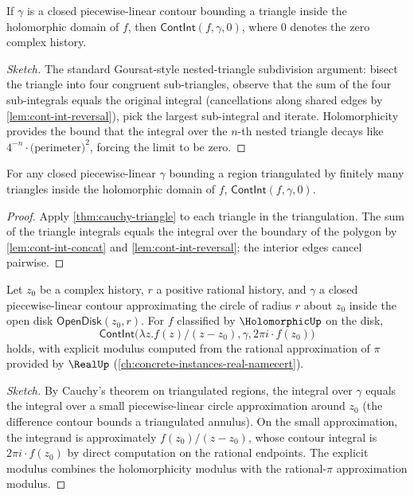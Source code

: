 \begin{theorem}
\label{thm:cauchy-triangle}
If \(\gamma\) is a closed piecewise-linear contour bounding a triangle inside the holomorphic domain of \(f\), then \(\mathsf{ContInt}(f, \gamma, 0)\), where \(0\) denotes the zero complex history.
\end{theorem}
\begin{proof}[Sketch]
The standard Goursat-style nested-triangle subdivision argument: bisect the triangle into four congruent sub-triangles, observe that the sum of the four sub-integrals equals the original integral (cancellations along shared edges by \autoref{lem:cont-int-reversal}), pick the largest sub-integral and iterate. Holomorphicity provides the bound that the integral over the \(n\)-th nested triangle decays like \(4^{-n} \cdot \text{(perimeter)}^2\), forcing the limit to be zero.
\end{proof}

\begin{lemma}
\label{lem:cauchy-polygon}
For any closed piecewise-linear \(\gamma\) bounding a region triangulated by finitely many triangles inside the holomorphic domain of \(f\), \(\mathsf{ContInt}(f, \gamma, 0)\).
\end{lemma}
\begin{proof}
Apply \autoref{thm:cauchy-triangle} to each triangle in the triangulation. The sum of the triangle integrals equals the integral over the boundary of the polygon by \autoref{lem:cont-int-concat} and \autoref{lem:cont-int-reversal}; the interior edges cancel pairwise.
\end{proof}

\begin{theorem}
\label{thm:cauchy-integral-formula}
Let \(z_0\) be a complex history, \(r\) a positive rational history, and \(\gamma\) a closed piecewise-linear contour approximating the circle of radius \(r\) about \(z_0\) inside the open disk \(\mathsf{OpenDisk}(z_0, r)\). For \(f\) classified by \(\HolomorphicUp\) on the disk,
$$
\mathsf{ContInt}\bigl(\lambda z. f(z) / (z - z_0), \gamma, 2\pi i \cdot f(z_0)\bigr)
$$
holds, with explicit modulus computed from the rational approximation of \(\pi\) provided by \(\RealUp\) (\autoref{ch:concrete-instances-real-namecert}).
\end{theorem}
\begin{proof}[Sketch]
By Cauchy's theorem on triangulated regions, the integral over \(\gamma\) equals the integral over a small piecewise-linear circle approximation around \(z_0\) (the difference contour bounds a triangulated annulus). On the small approximation, the integrand is approximately \(f(z_0)/(z - z_0)\), whose contour integral is \(2\pi i \cdot f(z_0)\) by direct computation on the rational endpoints. The explicit modulus combines the holomorphicity modulus with the rational-\(\pi\) approximation modulus.
\end{proof}


